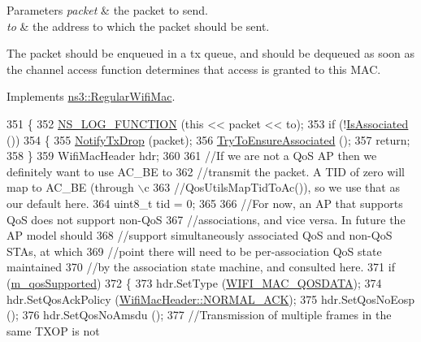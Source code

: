 \begin{DoxyParams}{Parameters}
{\em packet} & the packet to send. \\
\hline
{\em to} & the address to which the packet should be sent.\\
\hline
\end{DoxyParams}
The packet should be enqueued in a tx queue, and should be dequeued as soon as the channel access function determines that access is granted to this M\+AC. 

Implements \hyperlink{classns3_1_1RegularWifiMac_a646c2c6e87a90501f5688dfbde765bb7}{ns3\+::\+Regular\+Wifi\+Mac}.


\begin{DoxyCode}
351 \{
352   \hyperlink{log-macros-disabled_8h_a90b90d5bad1f39cb1b64923ea94c0761}{NS\_LOG\_FUNCTION} (\textcolor{keyword}{this} << packet << to);
353   \textcolor{keywordflow}{if} (!\hyperlink{classns3_1_1StaWifiMac_a8579a33f94aed726f149cf5ef783e9b5}{IsAssociated} ())
354     \{
355       \hyperlink{classns3_1_1WifiMac_aef7418bfb03d5146dda41c392f3e6671}{NotifyTxDrop} (packet);
356       \hyperlink{classns3_1_1StaWifiMac_a545fb78eb8b89ee48512820e31d76a81}{TryToEnsureAssociated} ();
357       \textcolor{keywordflow}{return};
358     \}
359   WifiMacHeader hdr;
360 
361   \textcolor{comment}{//If we are not a QoS AP then we definitely want to use AC\_BE to}
362   \textcolor{comment}{//transmit the packet. A TID of zero will map to AC\_BE (through \(\backslash\)c}
363   \textcolor{comment}{//QosUtilsMapTidToAc()), so we use that as our default here.}
364   uint8\_t tid = 0;
365 
366   \textcolor{comment}{//For now, an AP that supports QoS does not support non-QoS}
367   \textcolor{comment}{//associations, and vice versa. In future the AP model should}
368   \textcolor{comment}{//support simultaneously associated QoS and non-QoS STAs, at which}
369   \textcolor{comment}{//point there will need to be per-association QoS state maintained}
370   \textcolor{comment}{//by the association state machine, and consulted here.}
371   \textcolor{keywordflow}{if} (\hyperlink{classns3_1_1RegularWifiMac_aeecdb918687493a8efdd70304bc0cee9}{m\_qosSupported})
372     \{
373       hdr.SetType (\hyperlink{namespacens3_a9318472db39b35b2092de5c721e6ab0aafd37aea1ac3edba5410fac6367b19b1d}{WIFI\_MAC\_QOSDATA});
374       hdr.SetQosAckPolicy (\hyperlink{classns3_1_1WifiMacHeader_ae3a382482f357972019f5e1b3162adc4a9f52b9c6ca65d046ce2be9d70bce28cf}{WifiMacHeader::NORMAL\_ACK});
375       hdr.SetQosNoEosp ();
376       hdr.SetQosNoAmsdu ();
377       \textcolor{comment}{//Transmission of multiple frames in the same TXOP is not}

\end{DoxyCode}
